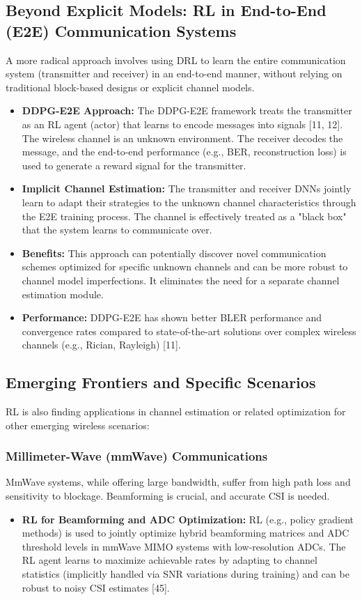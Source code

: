 \documentclass[journal,twocolumn]{IEEEtran}
\begin{document}
\subsection{Beyond Explicit Models: RL in End-to-End (E2E) Communication Systems}
A more radical approach involves using DRL to learn the entire communication system (transmitter and receiver) in an end-to-end manner, without relying on traditional block-based designs or explicit channel models.
\begin{itemize}
    \item \textbf{DDPG-E2E Approach:} The DDPG-E2E framework treats the transmitter as an RL agent (actor) that learns to encode messages into signals [11, 12]. The wireless channel is an unknown environment. The receiver decodes the message, and the end-to-end performance (e.g., BER, reconstruction loss) is used to generate a reward signal for the transmitter.
    \item \textbf{Implicit Channel Estimation:} The transmitter and receiver DNNs jointly learn to adapt their strategies to the unknown channel characteristics through the E2E training process. The channel is effectively treated as a "black box" that the system learns to communicate over.
    \item \textbf{Benefits:} This approach can potentially discover novel communication schemes optimized for specific unknown channels and can be more robust to channel model imperfections. It eliminates the need for a separate channel estimation module.
    \item \textbf{Performance:} DDPG-E2E has shown better BLER performance and convergence rates compared to state-of-the-art solutions over complex wireless channels (e.g., Rician, Rayleigh) [11].
\end{itemize}

\subsection{Emerging Frontiers and Specific Scenarios}
RL is also finding applications in channel estimation or related optimization for other emerging wireless scenarios:

\subsubsection{Millimeter-Wave (mmWave) Communications}
MmWave systems, while offering large bandwidth, suffer from high path loss and sensitivity to blockage. Beamforming is crucial, and accurate CSI is needed.
\begin{itemize}
    \item \textbf{RL for Beamforming and ADC Optimization:} RL (e.g., policy gradient methods) is used to jointly optimize hybrid beamforming matrices and ADC threshold levels in mmWave MIMO systems with low-resolution ADCs. The RL agent learns to maximize achievable rates by adapting to channel statistics (implicitly handled via SNR variations during training) and can be robust to noisy CSI estimates [45].
\end{itemize}
\end{document}
